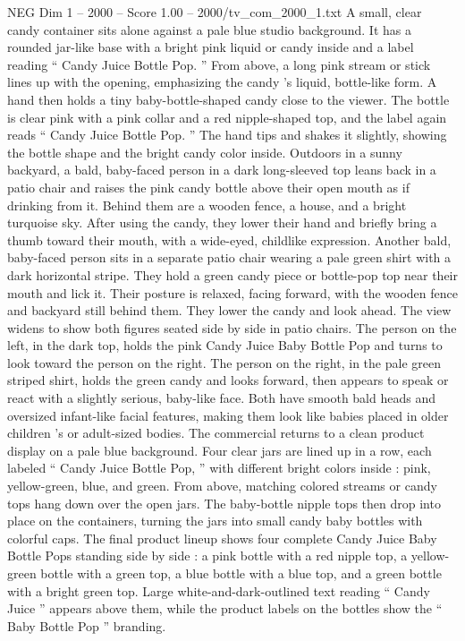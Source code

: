 \begin{textsample}{NEG Dim 1 – 2000 – Score 1.00 – 2000/tv\_com\_2000\_1.txt}  \label{ex:f1_neg_067}
A small, clear candy container sits alone against a pale blue studio background.
It has a rounded jar-like base with a bright pink liquid or candy inside and a label reading “ Candy Juice Bottle Pop. ” From above, a long pink stream or stick lines up with the opening, emphasizing the candy ’s liquid, bottle-like form.
A hand then holds a tiny baby-bottle-shaped candy close to the viewer.
The bottle is clear pink with a pink collar and a red nipple-shaped top, and the label again reads “ Candy Juice Bottle Pop. ” The hand tips and shakes it slightly, showing the bottle shape and the bright candy color inside.
Outdoors in a sunny backyard, a bald, baby-faced person in a dark long-sleeved top leans back in a patio chair and raises the pink candy bottle above their open mouth as if drinking from it.
Behind them are a wooden fence, a house, and a bright turquoise sky.
After using the candy, they lower their hand and briefly bring a thumb toward their mouth, with a wide-eyed, childlike expression.
Another bald, baby-faced person sits in a separate patio chair wearing a pale green shirt with a dark horizontal stripe.
They hold a green candy piece or bottle-pop top near their mouth and lick it.
Their posture is relaxed, facing forward, with the wooden fence and backyard still behind them.
They lower the candy and look ahead.
The view widens to show both figures seated side by side in patio chairs.
The person on the left, in the dark top, holds the pink Candy Juice Baby Bottle Pop and turns to look toward the person on the right.
The person on the right, in the pale green striped shirt, holds the green candy and looks forward, then appears to speak or react with a slightly serious, baby-like face.
Both have smooth bald heads and oversized infant-like facial features, making them look like babies placed in older children ’s or adult-sized bodies.
The commercial returns to a clean product display on a pale blue background.
Four clear jars are lined up in a row, each labeled “ Candy Juice Bottle Pop, ” with different bright colors inside : pink, yellow-green, blue, and green.
From above, matching colored streams or candy tops hang down over the open jars.
The baby-bottle nipple tops then drop into place on the containers, turning the jars into small candy baby bottles with colorful caps.
The final product lineup shows four complete Candy Juice Baby Bottle Pops standing side by side : a pink bottle with a red nipple top, a yellow-green bottle with a green top, a blue bottle with a blue top, and a green bottle with a bright green top.
Large white-and-dark-outlined text reading “ Candy Juice ” appears above them, while the product labels on the bottles show the “ Baby Bottle Pop ” branding.

\end{textsample}
